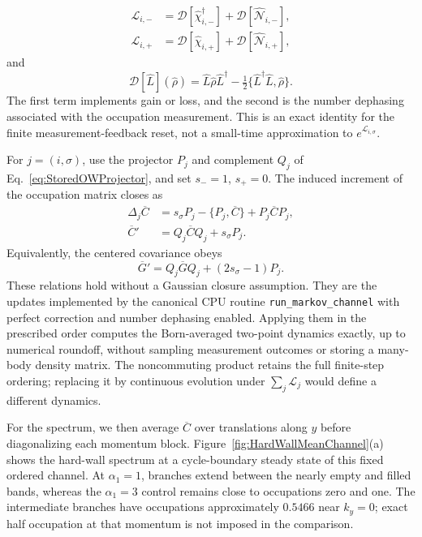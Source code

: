 \documentclass[aps,prb,twocolumn,superscriptaddress,longbibliography,floatfix]{revtex4-2}
\theoremstyle{plain}
\theoremstyle{definition}
\theoremstyle{remark}
\begin{document}
\begin{align}
 \mathcal L_{i,-}
 &=\mathcal D[\hat\chi_{i,-}^{\dagger}]
   +\mathcal D[\hat{\mathcal N}_{i,-}],\nonumber\\
 \mathcal L_{i,+}
 &=\mathcal D[\hat\chi_{i,+}]
   +\mathcal D[\hat{\mathcal N}_{i,+}],
 \label{eq:ElementaryChannelLindbladian}
\end{align}
and
\begin{equation}
 \mathcal D[\hat L](\hat\rho)
 =\hat L\hat\rho\hat L^\dagger
 -\tfrac12\{\hat L^\dagger\hat L,\hat\rho\}.
 \label{eq:AveragedChannelDissipator}
\end{equation}
The first term implements gain or loss, and the second is the number
dephasing associated with the occupation measurement.  This is an exact
identity for the finite measurement-feedback reset, not a small-time
approximation to $e^{\mathcal L_{i,\sigma}}$.

For $j=(i,\sigma)$, use the projector $P_j$ and complement $Q_j$ of
Eq.~\eqref{eq:StoredOWProjector}, and set $s_-=1$, $s_+=0$.  The induced
increment of the occupation matrix closes as
\begin{align}
 \Delta_j\overline C
 &=s_\sigma P_j-\{P_j,\overline C\}
   +P_j\overline C P_j,\nonumber\\
 \overline C'
 &=Q_j\overline C Q_j+s_\sigma P_j.
 \label{eq:ExactMeanChannelCovarianceUpdate}
\end{align}
Equivalently, the centered covariance obeys
\begin{equation}
 \overline G'=Q_j\overline GQ_j+(2s_\sigma-1)P_j.
 \label{eq:ExactMeanChannelCenteredUpdate}
\end{equation}
These relations hold without a Gaussian closure assumption.  They are the
updates implemented by the canonical CPU routine
\texttt{run\_markov\_channel} with perfect correction and number dephasing
enabled.  Applying them in the prescribed order computes the Born-averaged
two-point dynamics exactly, up to numerical roundoff, without sampling
measurement outcomes or storing a many-body density matrix.  The
noncommuting product retains the full finite-step ordering; replacing it
by continuous evolution under $\sum_j\mathcal L_j$ would define a
different dynamics.

For the spectrum, we then average $\overline C$ over translations along
$y$ before diagonalizing each momentum block.  Figure~\ref{fig:HardWallMeanChannel}(a)
shows the hard-wall spectrum at a cycle-boundary steady state of this
fixed ordered channel.  At $\alpha_1=1$, branches extend
between the nearly empty and filled bands, whereas the $\alpha_1=3$
control remains close to occupations zero and one.  The intermediate
branches have occupations approximately $0.5466$ near $k_y=0$;
exact half occupation at that momentum is not imposed in the comparison.
\end{document}
